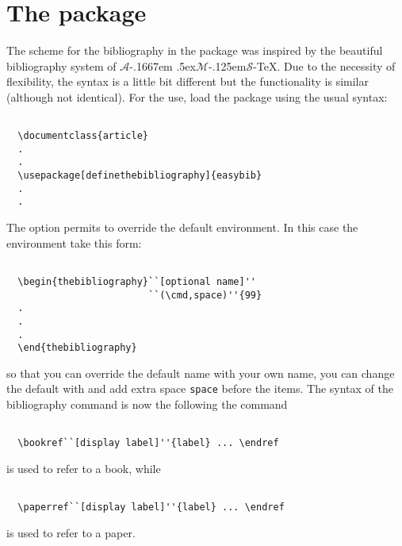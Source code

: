 \documentclass[a4paper]{article}
\newcommand{\AmSTeX}{{$\mathcal{A}$\kern-.1667em 
\lower.5ex\hbox{$\mathcal{M}$}\kern-.125em$\mathcal{S}$}-\TeX}
\begin{document}
\section{The package }
The scheme for the bibliography in the package 
was inspired by the beautiful
bibliography system of \AmSTeX{}. Due to the necessity of
flexibility, the syntax is a little bit different but the
functionality is similar (although not identical).
For the use, load the package using the usual syntax:
%
\begin{verbatim}
  
  \documentclass{article}
  .
  .
  \usepackage[definethebibliography]{easybib}
  .
  .

\end{verbatim}
The option  permits to override
the default  environment.
In this case the environment  take this form:
%
\begin{verbatim}
  
  \begin{thebibliography}``[optional name]''
                         ``(\cmd,space)''{99}
  .
  .
  .
  \end{thebibliography}

\end{verbatim}
%
so that you can override the default name  with your
own name, you can change the default  with
 and add extra space \verb'space' before the items.  The
syntax of the bibliography command is now the following
%
%
the command
%
\begin{verbatim}

  \bookref``[display label]''{label} ... \endref

\end{verbatim}
%
is used to refer to a book, while 
%
\begin{verbatim}

  \paperref``[display label]''{label} ... \endref

\end{verbatim}
%
is used to refer to a paper.
\end{document}
